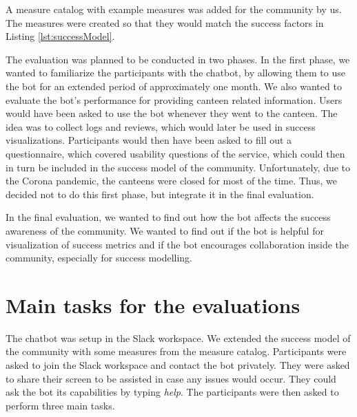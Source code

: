 A measure catalog with example measures was added for the community by us. The measures were created so that they would match the success factors in Listing \ref{lst:successModel}.

The evaluation was planned to be conducted in two phases.
In the first phase, we wanted to familiarize the participants with the chatbot, by allowing them to use the bot for an extended period of approximately one month. 
We also wanted to evaluate the bot's performance for providing canteen related information.
Users would have been asked to use the bot whenever they went to the canteen. 
The idea was to collect logs and reviews, which would later be used in success visualizations. 
Participants would then have been asked to fill out a questionnaire, which covered usability questions of the service, which could then in turn be included in the success model of the community.
Unfortunately, due to the Corona pandemic, the canteens were closed for most of the time. Thus, we decided not to do this first phase, but integrate it in the final evaluation.

In the final evaluation, we wanted to find out how the bot affects the success awareness of the community.
We wanted to find out if the bot is helpful for visualization of success metrics and if the bot encourages collaboration inside the community, especially for success modelling.



\section{Main tasks for the evaluations}

The chatbot was setup in the Slack workspace. 
We extended the success model of the community with some measures from the measure catalog. 
Participants were asked to join the Slack workspace and contact the bot privately. They were asked to share their screen to be assisted in case any issues would occur. They could ask the bot its capabilities by typing \emph{help}.
The participants were then asked to perform three main tasks.


